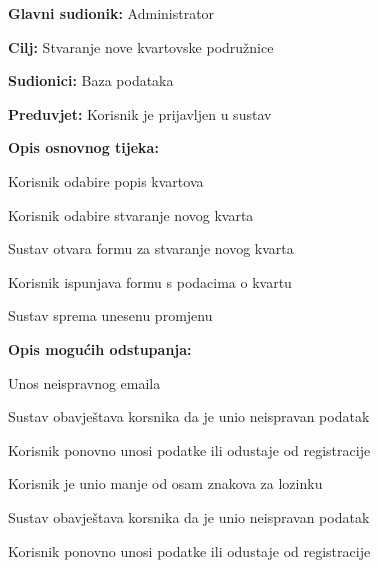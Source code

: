 					\begin{packed_item}
	
						\item \textbf{Glavni sudionik: }Administrator
						\item  \textbf{Cilj:} Stvaranje nove kvartovske podružnice
						\item  \textbf{Sudionici:} Baza podataka
						\item  \textbf{Preduvjet:} Korisnik je prijavljen u sustav
						\item  \textbf{Opis osnovnog tijeka:}
						
						\item[] \begin{packed_enum}
	
							\item Korisnik odabire popis kvartova
							\item Korisnik odabire stvaranje novog kvarta
							\item Sustav otvara formu za stvaranje novog kvarta
							\item Korisnik ispunjava formu s podacima o kvartu
							\item Sustav sprema unesenu promjenu
							
						\end{packed_enum}
						
						\item  \textbf{Opis mogućih odstupanja:}
						
						\item[] \begin{packed_item}
	
							\item[2.a] Unos neispravnog emaila
							
							\item[] \begin{packed_enum}
								
								\item Sustav obavještava korsnika da je unio neispravan podatak
								\item Korisnik ponovno unosi podatke ili odustaje od registracije
								
							\end{packed_enum}
							\item[2.b] Korisnik je unio manje od osam znakova za lozinku
							
								\item[] \begin{packed_enum}
								
								\item Sustav obavještava korsnika da je unio neispravan podatak
								\item Korisnik ponovno unosi podatke ili odustaje od registracije
								
							\end{packed_enum}
							
						\end{packed_item}
					\end{packed_item}
				
